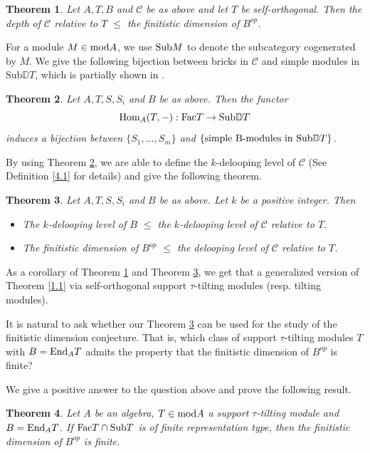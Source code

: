\documentclass[a4paper]{amsart}
\newtheorem{thm}{Theorem}[section]
\theoremstyle{definition}
\theoremstyle{remark}
\numberwithin{equation}{section}
\begin{document}
\begin{thm}\label{1.2}
 Let $A, T, B$ and $\mathcal{C}$ be as above and let $T$ be self-orthogonal. Then the depth of $\mathcal{C}$ relative to $T$ $\leq$ the finitistic dimension of $B^{op}$.
\end{thm}

For a module $M\in {\rm mod}A$, we use ${\rm Sub}M$ to denote the subcategory cogenerated by $M$. We give the following bijection between bricks in $\mathcal{C}$ and simple modules in $\text{Sub}\mathbb{D}T$, which is partially shown in \cite{As}.

\begin{thm}\label{1.3}
 Let $A, T, S, S_i$ and $B$ be as above. Then the functor
 $$\textup{Hom}_A(T, -): \textup{Fac}T \to \textup{Sub}\mathbb{D}T$$
  induces a bijection between $\{S_1, \dots, S_m\}$ and $\{\text{simple B-modules in \textup{Sub}}\mathbb{D}T\}$.
\end{thm}

By using Theorem \ref{1.3}, we are able to define the $k$-delooping level of $\mathcal{C}$ (See Definition \ref{4.1} for details) and give the following theorem.

\begin{thm}\label{1.4}
   Let $A, T, S, S_i$ and $ B$ be as above. Let $k$ be a positive integer. Then
\begin{itemize}
    \item
    [(1)] The $k$-delooping level of $B$ $\leq$ the $k$-delooping level of $\mathcal{C}$ relative to $T$.
    \item
    [(2)] The finitistic dimension of $B^{op}$ $\leq$ the delooping level of $\mathcal{C}$ relative to $T$.
\end{itemize}
\end{thm}

As a corollary of Theorem \ref{1.2} and Theorem \ref{1.4}, we get that a generalized version of Theorem \ref{1.1} via self-orthogonal support $\tau$-tilting modules (resp. tilting modules).

It is natural to ask whether our Theorem \ref{1.4} can be used for the study of the finitistic dimension conjecture. That is, which class of support $\tau$-tilting modules $T$ with $B={\rm End}_A T$ admits the property that the finitistic dimension of $B^{op}$ is finite?

 We give a positive answer to the question above and prove the following result.

\begin{thm}\label{1.5} Let $A$ be an algebra, $T\in {\rm mod}A$ a support $\tau$-tilting module and $B={\rm End}_A T$. If ${\rm Fac}T\cap {\rm Sub}T$ is of finite representation type, then the finitistic dimension of $B^{op}$ is finite.
  \end{thm}
\end{document}
